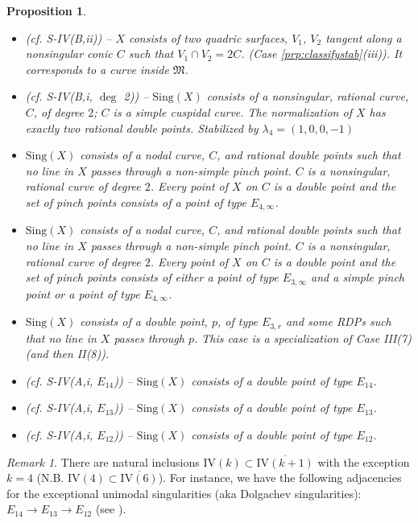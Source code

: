 \documentclass[11pt]{amsart}
\numberwithin{equation}{section}
\theoremstyle{plain}
\newtheorem{proposition}[theorem]{Proposition}
\theoremstyle{remark}
\newtheorem{remark}[theorem]{Remark}
\theoremstyle{definition}
\newcommand{\Sing}{\mathrm{Sing}}
\newcommand{\gM}{\mathfrak{M}}
\begin{document}
\begin{proposition}
\begin{itemize}
\item[IV(1)] (cf. S-IV(B,ii)) -- $X$ consists of two quadric surfaces, $V_1$, $V_2$ tangent along a nonsingular conic $C$ such that $V_1\cap V_2=2C$. (Case \ref{prp:classifystab}(iii)). It corresponds to a curve inside $ \gM$. 
 \item[IV(2)]  (cf. S-IV(B,i, $\deg$ 2)) -- $\Sing(X)$ consists of a nonsingular, rational
curve, $C$, of degree $2$; $C$ is a simple cuspidal curve. The normalization of $X$ has exactly two rational double points. Stabilized by $\lambda_4=(1,0,0,-1)$
 \item[IV(3)] $\Sing(X)$  consists of a nodal curve, $C$, and rational double points such that no line in $X$ passes through a non-simple pinch point. $C$ is a nonsingular, rational curve of degree $2$. Every point of $X$ on $C$ is a double point and the set of pinch points consists of  a point of type $E_{4,\infty}$.
  \item[IV(4)] $\Sing(X)$  consists of a nodal curve, $C$, and rational double points such that no line in $X$ passes through a non-simple pinch point. $C$ is a nonsingular, rational curve of degree $2$. Every point of $X$ on $C$ is a double point and the set of pinch points consists of either a point of type $E_{3,\infty}$ and a simple pinch point or a point of type $E_{4,\infty}$.
 \item[IV(5)] $\Sing(X)$ consists of a double point, $p$, of
type  $E_{3,r}$ and some RDPs such that no line in $X$ passes through $p$. This case is a specialization of Case III(7) (and then II(8)).   
 \item[IV(6)] (cf. S-IV(A,i, $E_{14}$)) -- $\Sing(X)$ consists of a double point of
type $E_{14}$.
 \item[IV(7)] (cf. S-IV(A,i, $E_{13}$)) -- $\Sing(X)$ consists of a double point of
type $E_{13}$.
 \item[IV(8)]  (cf. S-IV(A,i, $E_{12}$)) --  $\Sing(X)$ consists of a double point of
type $E_{12}$.
\end{itemize}
 \end{proposition}

\begin{remark}\label{rmk:reminclusion}
There are natural inclusions $\mathrm{IV}(k)\subset \overline{\mathrm{IV}(k+1)}$ with the exception $k=4$ (N.B.  $\mathrm{IV}(4)\subset \overline{\mathrm{IV}(6)}$). For instance, we have the following adjacencies  for  the exceptional unimodal singularities (aka Dolgachev singularities): $E_{14}\longrightarrow E_{13}\longrightarrow E_{12}$ (see \cite[p. 159]{arnold}). 
\end{remark}
\end{document}
